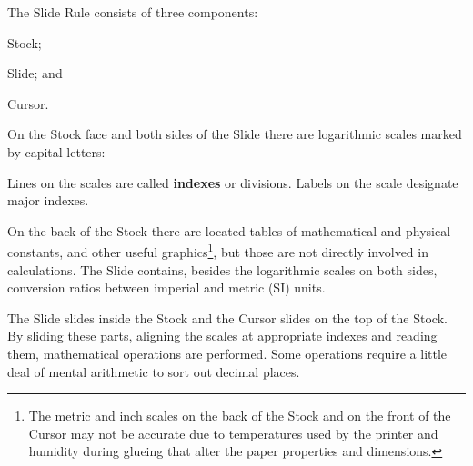   \begin{multicols*}{3}
  \normalsize{
  The Slide Rule consists of three components:
    \begin{inparaenum}[a\upshape)]
      \item Stock;
      \item Slide; and
      \item Cursor.
    \end{inparaenum}

  On the Stock face and both sides of the Slide there are logarithmic scales marked by capital letters:

  
  Lines on the scales are called \textbf{indexes} or divisions. Labels on the scale designate major indexes.

  On the back of the Stock there are located tables of mathematical and physical constants, and other useful graphics\footnote{The metric and inch scales on the back of the Stock and on the front of the Cursor may not be accurate due to temperatures used by the printer and humidity during glueing that alter the paper properties and dimensions.}, but those are not directly involved in calculations. The Slide contains, besides the logarithmic scales on both sides, conversion ratios between imperial and metric (SI) units.

  The Slide slides inside the Stock and the Cursor slides on the top of the Stock. By sliding these parts, aligning the scales at appropriate indexes and reading them, mathematical operations are performed. Some operations require a little deal of mental arithmetic to sort out decimal places.

}
\end{multicols*}
